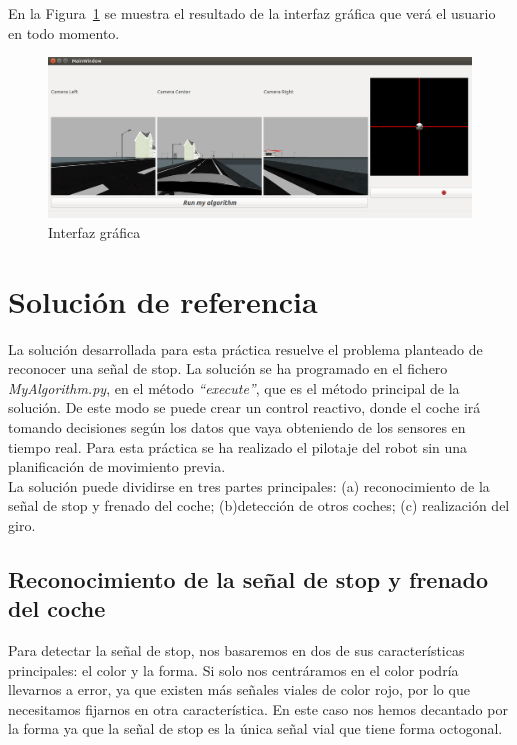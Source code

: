 En la Figura~\ref{fig.stopGUI} se muestra el resultado de la interfaz gráfica que verá el usuario en todo momento.

\begin{figure}[H]
  \begin{center}
    \includegraphics[width=1.0\textwidth]{figures/Stop/stopGUI.png}
		\caption{Interfaz gráfica}
		\label{fig.stopGUI}
		\end{center}
\end{figure}


\section{Solución de referencia}
La solución desarrollada para esta práctica resuelve el problema planteado de reconocer una señal de stop. La solución se ha programado en el fichero \textit{MyAlgorithm.py}, en el método \textit{``execute''}, que es el método principal de la solución. De este modo se puede crear un control reactivo, donde el coche irá tomando decisiones según los datos que vaya obteniendo de los sensores en tiempo real. Para esta práctica se ha realizado el pilotaje del robot sin una planificación de movimiento previa.\\

La solución puede dividirse en tres partes principales: (a) reconocimiento de la señal de stop y frenado del coche; (b)detección de otros coches; (c) realización del giro. 

\subsection{Reconocimiento de la señal de stop y frenado del coche}
Para detectar la señal de stop, nos basaremos en dos de sus características principales: el color y la forma. Si solo nos centráramos en el color podría llevarnos a error, ya que existen más señales viales de color rojo, por lo que necesitamos fijarnos en otra característica. En este caso nos hemos decantado por la forma ya que la señal de stop es la única señal vial que tiene forma octogonal. \\

